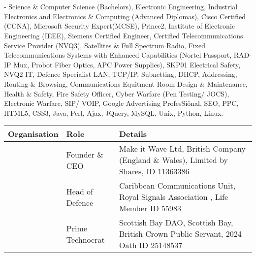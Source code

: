 \documentclass[letterpaper,10pt,english]{sphinxmanual}
\begin{document}
\chapter{}
\label{\detokenize{index:document-author-s}}
 - Science \& Computer Science (Bachelors), Electronic Engineering, Industrial Electronics and Electronics \& Computing (Advanced Diplomas), Cisco Certified (CCNA), Microsoft Security Expert(MCSE), Prince2, Institute of Electronic Engineering (IEEE), Siemens Certified Engineer, Certified Telecommunications Service Provider (NVQ3), Satellites \& Full Spectrum Radio, Fixed Telecommunications Systems with Enhanced Capabilities (Nortel Passport, RAD-IP Mux, Probot Fiber Optics, APC Power Supplies), SKP01 Electrical Safety, NVQ2 IT, Defence Specialist LAN, TCP/IP, Subnetting, DHCP, Addressing, Routing \& Browsing, Communications Equitment Room Design \& Maintenance, Health \& Safety, Fire Safety Officer, Cyber Warfare (Pen Testing/ JOCS), Electronic Warfare, SIP/ VOIP, Google Advertising ProfesSiônal, SEO, PPC, HTML5, CSS3, Java, Perl, Ajax, JQuery, MySQL, Unix, Python, Linux.


\begin{savenotes}\sphinxattablestart
\centering
\begin{tabulary}{\linewidth}[t]{|T|T|T|}
\hline
\sphinxstyletheadfamily 
Organisation
&\sphinxstyletheadfamily 
Role
&\sphinxstyletheadfamily 
Details
\\
\hline
\noindent{}
&
Founder \& CEO
&
Make it Wave Ltd, British Company (England \& Wales), Limited by Shares, ID 11363386
\\
\hline
\noindent{}
&
Head of Defence
&
Caribbean Communications Unit, Royal Signals Association , Life Member ID 55983
\\
\hline
\noindent{}
&
Prime Technocrat
&
Scottish Bay DAO, Scottish Bay, British Crown Public Servant, 2024 Oath ID 25148537
\\
\hline
\end{tabulary}
\par
\sphinxattableend\end{savenotes}



\renewcommand{\indexname}{Index}
\printindex
\end{document}
